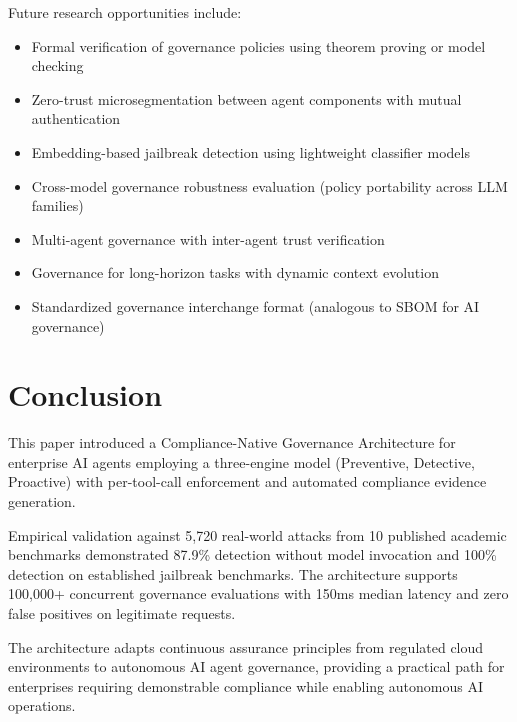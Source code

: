 \documentclass[conference]{IEEEtran}
\begin{document}
Future research opportunities include:

\begin{itemize}
\item Formal verification of governance policies using theorem proving or model checking
\item Zero-trust microsegmentation between agent components with mutual authentication
\item Embedding-based jailbreak detection using lightweight classifier models
\item Cross-model governance robustness evaluation (policy portability across LLM families)
\item Multi-agent governance with inter-agent trust verification
\item Governance for long-horizon tasks with dynamic context evolution
\item Standardized governance interchange format (analogous to SBOM for AI governance)
\end{itemize}

\section{Conclusion}

This paper introduced a Compliance-Native Governance Architecture for enterprise AI agents employing a three-engine model (Preventive, Detective, Proactive) with per-tool-call enforcement and automated compliance evidence generation.

Empirical validation against 5,720 real-world attacks from 10 published academic benchmarks demonstrated 87.9\% detection without model invocation and 100\% detection on established jailbreak benchmarks. The architecture supports 100,000+ concurrent governance evaluations with 150ms median latency and zero false positives on legitimate requests.

The architecture adapts continuous assurance principles from regulated cloud environments to autonomous AI agent governance, providing a practical path for enterprises requiring demonstrable compliance while enabling autonomous AI operations.
\end{document}
